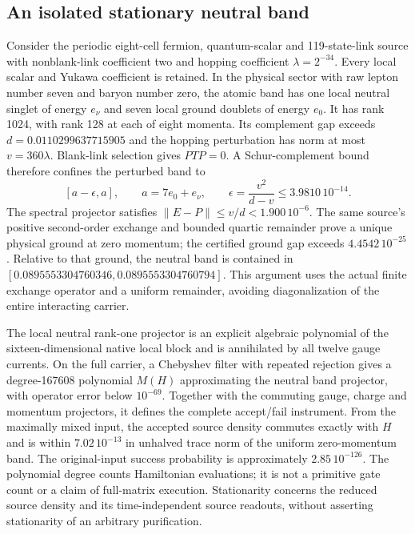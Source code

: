 \subsection{An isolated stationary neutral band}

Consider the periodic eight-cell fermion, quantum-scalar and 119-state-link
source with nonblank-link coefficient two and hopping coefficient
$\lambda=2^{-34}$. Every local scalar and Yukawa coefficient is retained.
In the physical sector with raw lepton number seven and baryon number zero,
the atomic band has one local neutral singlet of energy $e_\nu$ and
seven local ground doublets of energy $e_0$. It has rank 1024, with rank 128 at each of eight momenta.
Its complement gap exceeds $d=0.0110299637715905$ and the hopping
perturbation has norm at most $v=360\lambda$. Blank-link selection gives
$PTP=0$. A Schur-complement bound therefore confines the perturbed band to
\[
 [a-\epsilon,a],\qquad a=7e_0+e_\nu,\qquad
 \epsilon=\frac{v^2}{d-v}\leq3.9810\,10^{-14}.
\]
The spectral projector satisfies $\|E-P\|\leq v/d<1.900\,10^{-6}$.
The same source's positive second-order exchange and bounded quartic
remainder prove a unique physical ground at zero momentum; the
certified ground gap exceeds $4.4542\,10^{-25}$.
Relative to that ground, the neutral band is contained in
$[0.0895553304760346,0.0895553304760794]$.
This argument uses the actual finite exchange operator and a uniform
remainder, avoiding diagonalization of the entire interacting carrier.

The local neutral rank-one projector is an explicit algebraic polynomial
of the sixteen-dimensional native local block and is annihilated by all
twelve gauge currents. On the full carrier, a Chebyshev filter with
repeated rejection gives a degree-167608 polynomial $M(H)$ approximating
the neutral band projector, with operator error below $10^{-69}$.
Together with the commuting gauge, charge and momentum projectors, it
defines the complete accept/fail instrument. From the maximally mixed
input, the accepted source density commutes exactly with $H$ and is
within $7.02\,10^{-13}$ in unhalved trace norm of the uniform
zero-momentum band. The original-input success probability is approximately
$2.85\,10^{-126}$. The polynomial degree counts Hamiltonian evaluations;
it is not a primitive gate count or a claim of full-matrix execution.
Stationarity concerns the reduced source density and its time-independent
source readouts, without asserting stationarity of an arbitrary purification.


